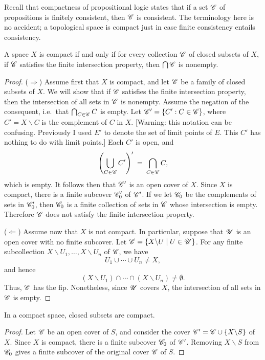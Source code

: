 Recall that compactness of propositional logic states that if a set
$\mathscr C$ of propositions is finitely consistent, then $\mathscr C$ is
consistent.  The terminology here is no accident; a topological space
is compact just in case finite consistency entails consistency.

\begin{prop} A space $X$ is compact if and only if for every
  collection $\mathscr C$ of closed subsets of $X$, if $\mathscr C$ satisfies the
  finite intersection property, then $\bigcap \mathscr C$ is
  nonempty. \end{prop}

\begin{proof} ($\Rightarrow$) Assume first that $X$ is compact, and
  let $\mathscr C$ be a family of closed subsets of $X$.  We will show that
  if $\mathscr C$ satisfies the finite intersection property, then the
  intersection of all sets in $\mathscr C$ is nonempty.  Assume the negation
  of the consequent, i.e.\ that $\bigcap _{C\in\mathscr C}C$ is empty.  Let
  $\mathscr C '=\{ C' :C\in \mathscr C \}$, where $C'=X\backslash C$ is the
  complement of $C$ in $X$.  [Warning: this notation can be confusing.
  Previously I used $E'$ to denote the set of limit points of $E$.
  This $C'$ has nothing to do with limit points.]  Each $C'$ is open,
  and
$$ \left( \bigcup _{C\in \mathscr C}C' \right) ' \: = \: \bigcap _{C\in\mathscr C}C ,$$
which is empty.  It follows then that $\mathscr C '$ is an open cover of $X$.
Since $X$ is compact, there is a finite subcover $\mathscr C '_0$ of $\mathscr C '$.
If we let $\mathscr C _0$ be the complements of sets in $\mathscr C '_0$, then $\mathscr C
_0$ is a finite collection of sets in $\mathscr C$ whose intersection is
empty.  Therefore $\mathscr C$ does not satisfy the finite intersection
property.

($\Leftarrow$) Assume now that $X$ is not compact.  In particular,
suppose that $\mathscr U$ is an open cover with no finite
subcover.  Let $\mathscr C = \{ X\backslash U\mid U\in \mathscr U \}$.  For any
finite subcollection $X\backslash U_1,\dots ,X\backslash U_n$ of
$\mathscr C$, we have 
\[ U_1\cup\cdots\cup U_n \neq X ,\]
and hence 
\[ (X\backslash U_1)\cap \cdots \cap (X\backslash U_n)\neq \emptyset
.\] Thus, $\mathscr C$ has the fip.  Nonetheless, since $\mathscr U$ covers $X$, the
intersection of all sets in $\mathscr C$ is empty.  \end{proof}

\begin{prop} In a compact space, closed subsets are
  compact.  \label{closed-compact} \end{prop}

\begin{proof} Let $\mathscr C$ be an open cover of $S$, and consider the
  cover $\mathscr C' = \mathscr C \cup \{ X\backslash S \}$ of $X$.  Since $X$ is
  compact, there is a finite subcover $\mathscr C _0$ of $\mathscr C '$.  Removing
  $X\backslash S$ from $\mathscr C _0$ gives a finite subcover of the
  original cover $\mathscr C$ of $S$. \end{proof}


